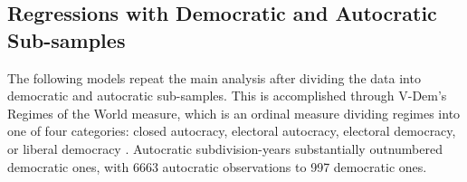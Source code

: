 \documentclass[12pt, letterpaper]{article}
\renewcommand{\cite}{\citep}
\begin{document}
\subsection{Regressions with Democratic and Autocratic Sub-samples}

The following models repeat the main analysis after dividing the data into democratic and autocratic sub-samples. This is accomplished through V-Dem’s Regimes of the World measure, which is an ordinal measure dividing regimes into one of four categories: closed autocracy, electoral autocracy, electoral democracy, or liberal democracy \cite{vdemcodebook, luhrmann2018regimes}. Autocratic subdivision-years substantially outnumbered democratic ones, with 6663 autocratic observations to 997 democratic ones.





\end{document}
